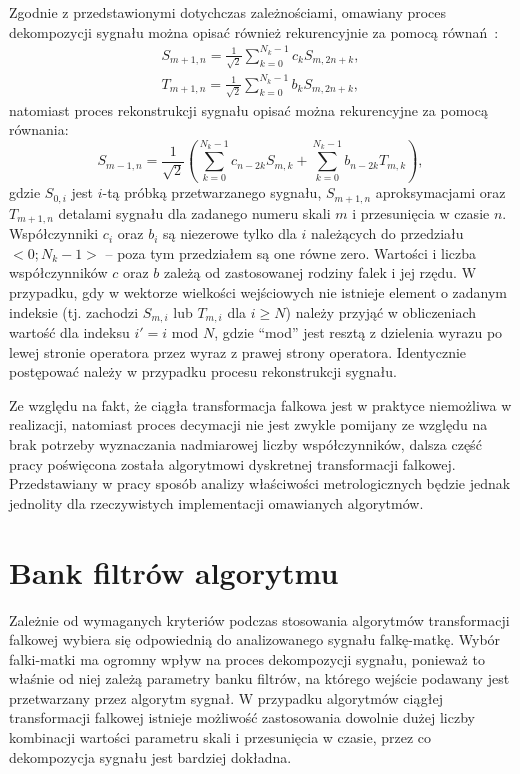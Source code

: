 Zgodnie z przedstawionymi dotychczas zależnościami, omawiany proces dekompozycji sygnału można opisać również rekurencyjnie za pomocą równań~\cite{wallen_handbook}:
\begin{gather}
S_{m+1,n} = \frac{1}{\sqrt{2}} \sum _{k=0} ^{N_k-1} c_{k} S_{m,2n+k} \label{eq:dwt_aproxrek}, \\
T_{m+1,n} = \frac{1}{\sqrt{2}} \sum _{k=0} ^{N_k-1} b_{k} S_{m,2n+k} \label{eq:dwt_detailrek},
\end{gather}
natomiast proces rekonstrukcji sygnału opisać można rekurencyjne za pomocą równania:
\begin{equation}
S_{m-1,n} = \frac{1}{\sqrt{2}} \left( \sum _{k=0} ^{N_k-1} c_{n-2k} S_{m,k} + \sum _{k=0} ^{N_k-1} b_{n-2k} T_{m,k} \right) \label{eq:dwt_reconrek},
\end{equation}
gdzie $S_{0,i}$ jest $i$-tą próbką przetwarzanego sygnału, $S_{m+1,n}$ aproksymacjami oraz $T_{m+1,n}$ detalami sygnału dla zadanego numeru skali $m$ i przesunięcia w czasie $n$. Współczynniki $c_i$ oraz $b_i$ są niezerowe tylko dla $i$ należących do przedziału $<0;N_k-1>$ -- poza tym przedziałem są one równe zero. Wartości i liczba współczynników $c$ oraz $b$ zależą od zastosowanej rodziny falek i jej rzędu. W przypadku, gdy w wektorze wielkości wejściowych nie istnieje element o zadanym indeksie (tj. zachodzi $S_{m,i}$ lub $T_{m,i}$ dla $i \ge N$) należy przyjąć w obliczeniach wartość dla indeksu $i' = i \text{ mod } N$, gdzie \enquote{mod} jest resztą z dzielenia wyrazu po lewej stronie operatora przez wyraz z prawej strony operatora. Identycznie postępować należy w przypadku procesu rekonstrukcji sygnału.

Ze względu na fakt, że ciągła transformacja falkowa jest w praktyce niemożliwa w realizacji, natomiast proces decymacji nie jest zwykle pomijany ze względu na brak potrzeby wyznaczania nadmiarowej liczby współczynników, dalsza część pracy poświęcona została algorytmowi dyskretnej transformacji falkowej. Przedstawiany w pracy sposób analizy właściwości metrologicznych będzie jednak jednolity dla rzeczywistych implementacji omawianych algorytmów.

\section{Bank filtrów algorytmu}

Zależnie od wymaganych kryteriów podczas stosowania algorytmów transformacji falkowej wybiera się odpowiednią do analizowanego sygnału falkę-matkę. Wybór falki-matki ma ogromny wpływ na proces dekompozycji sygnału, ponieważ to właśnie od niej zależą parametry banku filtrów, na którego wejście podawany jest przetwarzany przez algorytm sygnał. W przypadku algorytmów ciągłej transformacji falkowej istnieje możliwość zastosowania dowolnie dużej liczby kombinacji wartości parametru skali i przesunięcia w czasie, przez co dekompozycja sygnału jest bardziej dokładna.

